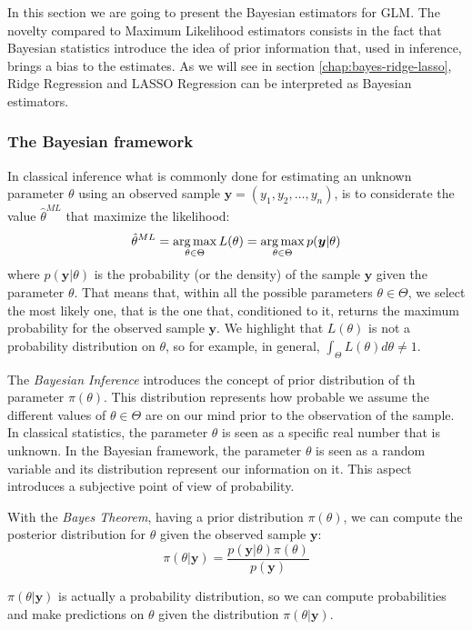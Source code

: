 \documentclass[a4paper, nobind]{templates/ociamthesis}
\theoremstyle{definition}
\theoremstyle{definition}
\theoremstyle{definition}
\theoremstyle{remark}
\begin{document}
In this section we are going to present the Bayesian estimators for GLM. The novelty compared to Maximum Likelihood estimators consists in the fact that Bayesian statistics introduce the idea of prior information that, used in inference, brings a bias to the estimates. As we will see in section \ref{chap:bayes-ridge-lasso}, Ridge Regression and LASSO Regression can be interpreted as Bayesian estimators.

\hypertarget{the-bayesian-framework}{%
\subsubsection{The Bayesian framework}\label{the-bayesian-framework}}

In classical inference what is commonly done for estimating an unknown parameter \(\theta\) using an observed sample \(\boldsymbol{y}=(y_1, y_2, \dots, y_n)\), is to considerate the value \(\hat{\theta}^{ML}\) that maximize the likelihood:
\[
\hat{\theta}^{ML} = \operatorname*{arg\,max}_{\theta\in\Theta}{L(\theta)} = \operatorname*{arg\,max}_{\theta\in\Theta}{p(\boldsymbol{y}|\theta)}
\]
where \(p(\boldsymbol{y}|\theta)\) is the probability (or the density) of the sample \(\boldsymbol{y}\) given the parameter \(\theta\). That means that, within all the possible parameters \(\theta\in\Theta\), we select the most likely one, that is the one that, conditioned to it, returns the maximum probability for the observed sample \(\boldsymbol{y}\). We highlight that \(L(\theta)\) is not a probability distribution on \(\theta\), so for example, in general, \(\int_{\Theta}{L(\theta)d\theta}\ne1\).

The \emph{Bayesian Inference} introduces the concept of prior distribution of th parameter \(\pi(\theta)\). This distribution represents how probable we assume the different values of \(\theta\in\Theta\) are on our mind prior to the observation of the sample. In classical statistics, the parameter \(\theta\) is seen as a specific real number that is unknown. In the Bayesian framework, the parameter \(\theta\) is seen as a random variable and its distribution represent our information on it. This aspect introduces a subjective point of view of probability.

With the \emph{Bayes Theorem}, having a prior distribution \(\pi(\theta)\), we can compute the posterior distribution for \(\theta\) given the observed sample \(\boldsymbol{y}\):
\[
\pi(\theta|\boldsymbol{y}) = \frac{p(\boldsymbol{y}|\theta)\pi(\theta)}{p(\boldsymbol{y})}
\]

\(\pi(\theta|\boldsymbol{y})\) is actually a probability distribution, so we can compute probabilities and make predictions on \(\theta\) given the distribution \(\pi(\theta|\boldsymbol{y})\).
\end{document}
